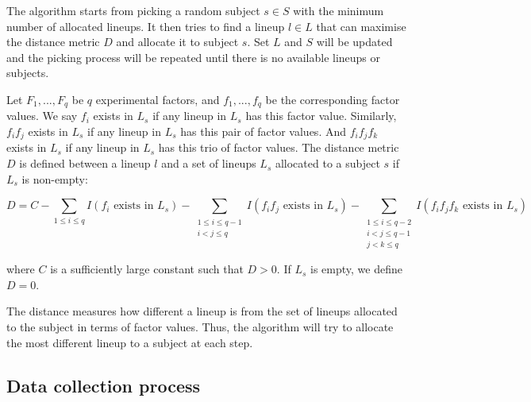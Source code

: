 \documentclass[]{interact}
\theoremstyle{plain}%
\theoremstyle{definition}
\theoremstyle{remark}
\begin{document}
The algorithm starts from picking a random subject \(s \in S\) with the
minimum number of allocated lineups. It then tries to find a lineup
\(l \in L\) that can maximise the distance metric \(D\) and allocate it
to subject \(s\). Set \(L\) and \(S\) will be updated and the picking
process will be repeated until there is no available lineups or
subjects.

Let \(F_1,...,F_q\) be \(q\) experimental factors, and \(f_1, ...,f_q\)
be the corresponding factor values. We say \(f_i\) exists in \(L_{s}\)
if any lineup in \(L_{s}\) has this factor value. Similarly, \(f_if_j\)
exists in \(L_{s}\) if any lineup in \(L_{s}\) has this pair of factor
values. And \(f_if_jf_k\) exists in \(L_{s}\) if any lineup in \(L_{s}\)
has this trio of factor values. The distance metric \(D\) is defined
between a lineup \(l\) and a set of lineups \(L_{s}\) allocated to a
subject \(s\) if \(L_{s}\) is non-empty:

\footnotesize

\begin{equation*}
D =
C - \sum_{1\leq i \leq q}I(f_i\text{ exists in }L_{s}) - \sum_{\substack{1\leq i \leq q-1 \\ i < j \leq q}}I(f_if_j\text{ exists in }L_{s}) - \sum_{\substack{1\leq i \leq q - 2 \\ i < j \leq q - 1 \\ j < k \leq q}}I(f_if_jf_k\text{ exists in }L_{s})
\end{equation*}

\normalsize

where \(C\) is a sufficiently large constant such that \(D > 0\). If
\(L_{s}\) is empty, we define \(D = 0\).

The distance measures how different a lineup is from the set of lineups
allocated to the subject in terms of factor values. Thus, the algorithm
will try to allocate the most different lineup to a subject at each
step.

\hypertarget{data-collection-process}{%
\subsection{Data collection process}\label{data-collection-process}}
\end{document}
